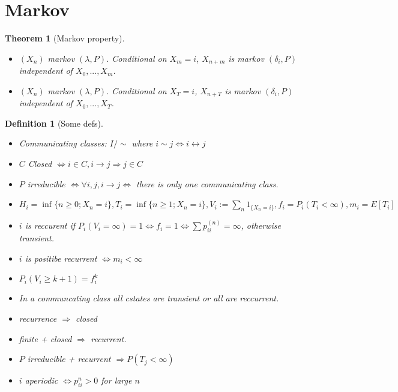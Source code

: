 \documentclass{article}
\newtheorem{theorem}{Theorem}
\newtheorem{definition}{Definition}
\begin{document}
\section{Markov}
\begin{theorem}[Markov property]
  \begin{itemize}
  \item $(X_n)$ markov $(\lambda, P)$. Conditional on $X_m = i$,
    $X_{n+m}$ is markov $(\delta_i, P)$ independent of
    $X_0, ..., X_m$.
  \item $(X_n)$ markov $(\lambda, P)$. Conditional on
    $X_T = i$, $X_{n+T}$ is markov $(\delta_i, P)$ independent of
    $X_0, ..., X_T$.
  \end{itemize}

\end{theorem}
\begin{definition}[Some defs]
  \begin{itemize}
  \item Communicating classes: $I / \sim$ where $i \sim j \iff i \leftrightarrow j$
  \item $C$ Closed $\iff i \in C, i \rightarrow j \Rightarrow j \in C$
  \item $P$ irreducible $\iff \forall i, j, i \rightarrow j \iff $  there is only one communicating class.
  \item $H_i = \inf\{ n \ge 0; X_n = i\}, T_i = \inf\{n \ge 1; X_n = i \}, V_i := \sum_n 1_{\{X_n = i\}}, f_i = P_i(T_i < \infty), m_i = E[T_i]$
  \item $i$ is reccurent if $P_i(V_i = \infty) = 1 \iff f_i = 1 \iff \sum p_{ii}^{(n)} = \infty$, otherwise transient.
  \item $i$ is positibe recurrent $\iff m_i < \infty$ 
  \item $P_i(V_i \ge k + 1) = f_i^k$
  \item In a communcating class all cstates are transient or all are reccurrent.
  \item recurrence $\Rightarrow$ closed
  \item finite  + closed $\Rightarrow$ recurrent.
  \item $P$ irreducible + recurrent $\Rightarrow P(T_j < \infty)$
  \item $i$ aperiodic $\iff p_{ii}^{n} > 0$ for large $n$
  \end{itemize}
\end{definition}
\end{document}
